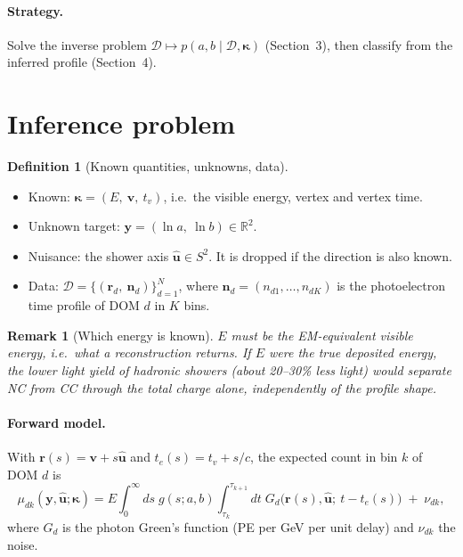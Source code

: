 \documentclass[11pt]{article}
\newtheorem{remark}{Remark}
\theoremstyle{definition}
\newtheorem{definition}{Definition}
\newcommand{\D}{\mathcal{D}}
\newcommand{\y}{\bm{y}}
\newcommand{\R}{\mathbb{R}}
\begin{document}
\paragraph{Strategy.}
Solve the inverse problem $\D\mapsto p(a,b\mid\D,\bm\kappa)$ (Section~3), then classify from the
inferred profile (Section~4).

\section{Inference problem}

\begin{definition}[Known quantities, unknowns, data]
\leavevmode
\begin{itemize}
  \item Known: $\bm\kappa = (E,\ \bm v,\ t_v)$, i.e.\ the visible energy, vertex and vertex time.
  \item Unknown target: $\y = (\ln a,\ \ln b)\in\R^2$.
  \item Nuisance: the shower axis $\hat{\bm u}\in S^2$. It is dropped if the direction is also
        known.
  \item Data: $\D = \{(\bm r_d,\ \bm n_d)\}_{d=1}^{N}$, where $\bm n_d = (n_{d1},\dots,n_{dK})$
        is the photoelectron time profile of DOM $d$ in $K$ bins.
\end{itemize}
\end{definition}

\begin{remark}[Which energy is known]
$E$ must be the \emph{EM-equivalent visible} energy, i.e.\ what a reconstruction returns. If $E$
were the true deposited energy, the lower light yield of hadronic showers (about 20--30\% less
light) would separate NC from CC through the total charge alone, independently of the profile
shape.
\end{remark}

\paragraph{Forward model.}
With $\bm r(s) = \bm v + s\hat{\bm u}$ and $t_e(s) = t_v + s/c$, the expected count in bin $k$
of DOM $d$ is
\begin{equation}
  \mu_{dk}(\y,\hat{\bm u};\bm\kappa) = E\int_0^\infty\! ds\; g(s;a,b)\int_{\tau_k}^{\tau_{k+1}}\!dt\;
  G_d\big(\bm r(s),\hat{\bm u};\ t - t_e(s)\big) \;+\; \nu_{dk},
  \label{eq:fwd}
\end{equation}
where $G_d$ is the photon Green's function (PE per GeV per unit delay) and $\nu_{dk}$ the noise.
\end{document}
